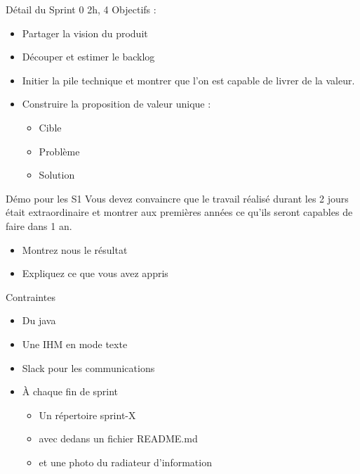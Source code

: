 \documentclass{beamer}
\begin{document}
\begin{frame}{Détail du Sprint 0}
  2h, 4 Objectifs :
  \begin{itemize}
    \item Partager la vision du produit
    \item Découper et estimer le backlog
    \item Initier la pile technique et montrer que l'on est capable de livrer de la valeur.
    \item Construire la proposition de valeur unique :
    \begin{itemize}
      \item Cible
      \item Problème
      \item Solution
    \end{itemize}
  \end{itemize}
\end{frame}

\begin{frame}{Démo pour les S1}
  Vous devez convaincre que le travail réalisé durant les 2 jours était extraordinaire et montrer aux premières années ce qu'ils seront capables de faire dans 1 an.
  \begin{itemize}
    \item Montrez nous le résultat
    \item Expliquez ce que vous avez appris
  \end{itemize}
\end{frame}

\begin{frame}{Contraintes}
  \begin{itemize}
    \item Du java
    \item Une IHM en mode texte
    \item Slack pour les communications
    \item À chaque fin de sprint
    \begin{itemize}
      \item Un répertoire sprint-X
      \item avec dedans un fichier README.md
      \item et une photo du radiateur d'information
    \end{itemize}
  \end{itemize}
\end{frame}
\end{document}
